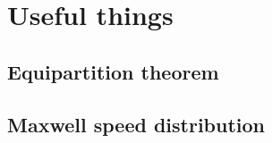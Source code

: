 \section{Useful things}
\subsection{Equipartition theorem}
\subsection{Maxwell speed distribution}

